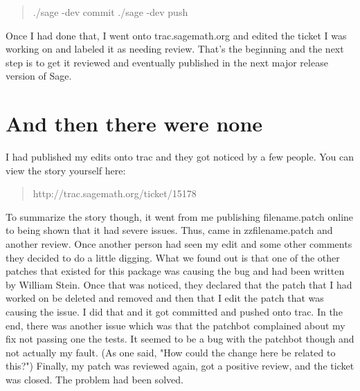 \documentclass{article}
\begin{document}
\begin{quote}
./sage -dev commit \newline
./sage -dev push
\end{quote}

Once I had done that, I went onto trac.sagemath.org and edited the ticket I was working on and labeled it as needing review. That's the beginning and the next step is to get it reviewed and eventually published in the next major release version of Sage.

\newpage
\section{And then there were none}
I had published my edits onto trac and they got noticed by a few people. You can view the story yourself here:
\begin{quote}
http://trac.sagemath.org/ticket/15178
\end{quote}
To summarize the story though, it went from me publishing filename.patch online to being shown that it had severe issues. Thus, came in zzfilename.patch and another review. Once another person had seen my edit and some other comments they decided to do a little digging. What we found out is that one of the other patches that existed for this package was causing the bug and had been written by William Stein. Once that was noticed, they declared that the patch that I had worked on be deleted and removed and then that I edit the patch that was causing the issue. I did that and it got committed and pushed onto trac.\newline
In the end, there was another issue which was that the patchbot complained about my fix not passing one the tests. It seemed to be a bug with the patchbot though and not actually my fault. (As one said, "How could the change here be related to this?") Finally, my patch was reviewed again, got a positive review, and the ticket was closed. The problem had been solved.

\newpage
\end{document}
